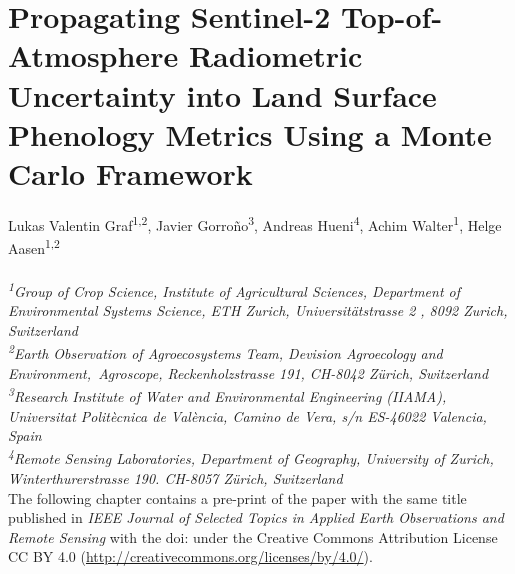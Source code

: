\chapter{Propagating Sentinel-2 Top-of-Atmosphere Radiometric Uncertainty into Land Surface Phenology Metrics Using a Monte Carlo Framework}
\label{chap:uncertainty}
\graphicspath{{./04-Uncertainty/img}}

Lukas Valentin Graf\textsuperscript{1,2}, Javier Gorro\~{n}o\textsuperscript{3}, Andreas Hueni\textsuperscript{4}, Achim Walter\textsuperscript{1}, Helge Aasen\textsuperscript{1,2}
\\
\normalsize
\vspace{2pt}
\\
\textit{\textsuperscript{1}Group of Crop Science, Institute of Agricultural Sciences, Department of Environmental Systems Science, ETH Zurich, Universitätstrasse 2 , 8092 Zurich, Switzerland
\\
\textsuperscript{2}Earth Observation of Agroecosystems Team, Devision Agroecology and Environment,\ Agroscope, Reckenholzstrasse 191, CH-8042 Zürich, Switzerland
\\
\textsuperscript{3}Research Institute of Water and Environmental Engineering (IIAMA), Universitat Politècnica de València, Camino de Vera, s/n ES-46022 Valencia, Spain
\\
\textsuperscript{4}Remote Sensing Laboratories, Department of Geography, University of Zurich, Winterthurerstrasse 190. CH-8057 Zürich, Switzerland
\vspace{0.1cm}}
\\

The following chapter contains a pre-print of the paper with the same title published in \textsl{IEEE Journal of Selected Topics in Applied Earth Observations and Remote Sensing} with the doi:  under the Creative Commons Attribution License CC BY 4.0 (\url{http://creativecommons.org/licenses/by/4.0/}).


